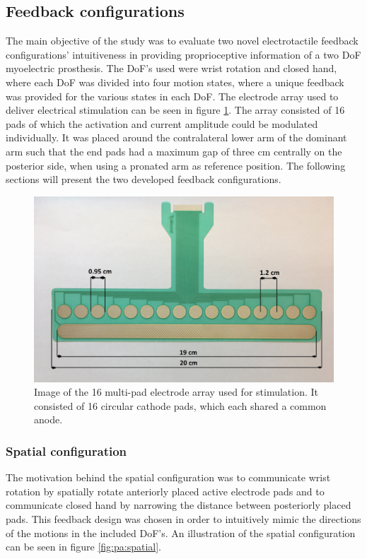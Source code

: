 \subsection{Feedback configurations}
The main objective of the study was to evaluate two novel electrotactile feedback configurations' intuitiveness in providing proprioceptive information of a two DoF myoelectric prosthesis. The DoF's used were wrist rotation and closed hand, where each DoF was divided into four motion states, where a unique feedback was provided for the various states in each DoF. The electrode array used to deliver electrical stimulation can be seen in figure \ref{fig:pa:electrode}. The array consisted of 16 pads of which the activation and current amplitude could be modulated individually. It was placed around the contralateral lower arm of the dominant arm such that the end pads had a maximum gap of three cm centrally on the posterior side, when using a pronated arm as reference position. The following sections will present the two developed feedback configurations. 

\begin{figure}[H]                 
	\includegraphics[width=.95\textwidth]{figures/electrode}  
	\caption{Image of the 16 multi-pad electrode array used for stimulation. It consisted of 16 circular cathode pads, which each shared a common anode.}
	\label{fig:pa:electrode} 
\end{figure}

\subsubsection{Spatial configuration}
The motivation behind the spatial configuration was to communicate wrist rotation by spatially rotate anteriorly placed active electrode pads and to communicate closed hand by narrowing the distance between posteriorly placed pads. This feedback design was chosen in order to intuitively mimic the directions of the motions in the included DoF's. An illustration of the spatial configuration can be seen in figure \ref{fig:pa:spatial}. 

